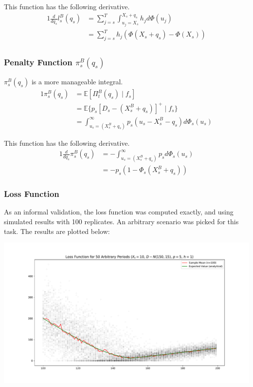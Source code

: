 \documentclass[12pt]{report}
\newcommand{\EX}{\mathbb{E}}
\begin{document}
This function has the following derivative.
\begin{alignat*}{1}
	\frac{d}{d q_s} l_s^B(q_s) &=  \sum_{j=s}^T \int_{u_j=X_s}^{X_s + q_s} h_j d\Phi(u_j) \\
		&=  \sum_{j=s}^T h_j (\Phi(X_s + q_s) - \Phi(X_s)) \\
\end{alignat*}

\subsubsection*{Penalty Function $\pi_s^B(q_s)$}

$\pi_s^B(q_s)$ is a more manageable integral.
\begin{alignat}{1}
	\pi_s^B(q_s) &= \EX [\Pi_t^B(q_s) \; | \; f_s] \nonumber \\
		&= \EX \bigg\{ p_s [D_s - (X_s^B + q_s)]^+  \; | \; f_s \bigg\} \nonumber \\
		&= \int_{u_s=({X_s^B + q_s})}^{\infty} p_s (u_s - X_s^B - q_s) d\Phi_s(u_s) 
\end{alignat}

This function has the following derivative.
\begin{alignat*}{1}
	\frac{d}{d q_s} \pi_s^B(q_s) &=  - \int_{u_s=({X_s^B + q_s})}^{\infty} p_s d\Phi_s(u_s) \\
		&= - p_s (1 - \Phi_s(X_s^B + q_s)) 
\end{alignat*}

\subsubsection*{Loss Function}

As an informal validation, the loss function was computed exactly, and using simulated results with 100 replicates. An arbitrary scenario was picked for this task. The results are plotted below:

\includegraphics[width=\textwidth]{loss.pdf}
\end{document}

